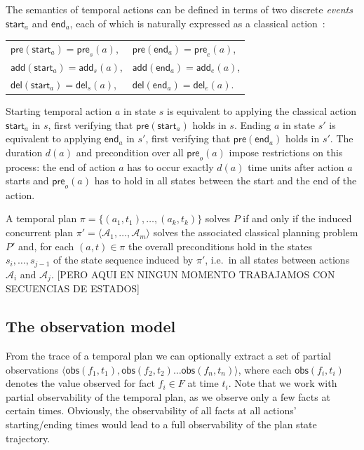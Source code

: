 \documentclass[runningheads]{llncs}
\newcommand{\tup}[1]{{\langle #1 \rangle}}
\newcommand{\pre}{\mathsf{pre}}    %
\newcommand{\obs}{\mathsf{obs}}    %
\newcommand{\add}{\mathsf{add}}
\newcommand{\del}{\mathsf{del}}
\begin{document}
The semantics of temporal actions can be defined in terms of two discrete \textit{events} $\mathsf{start}_a$ and $\mathsf{end}_a$, each of which is naturally expressed as a classical action~\cite{jimenez2015temporal}:

\vspace*{5pt}
\begin{tabular}{ll}
$\pre(\mathsf{start}_a) = \pre_s(a)$, & $\pre(\mathsf{end}_a) = \pre_e(a)$,\\[2pt]
$\add(\mathsf{start}_a) = \add_s(a)$, & $\add(\mathsf{end}_a) = \add_e(a)$,\\[2pt]
$\del(\mathsf{start}_a) = \del_s(a)$, & $\del(\mathsf{end}_a) = \del_e(a)$.
\end{tabular}
\vspace*{5pt}

Starting temporal action $a$ in state $s$ is equivalent to applying the classical action $\mathsf{start}_a$ in $s$, first verifying that $\mathsf{pre}(\mathsf{start}_a)$ holds in $s$. Ending $a$ in state $s'$ is equivalent to applying $\mathsf{end}_a$ in $s'$, first verifying that $\pre(\mathsf{end}_a)$ holds in $s'$. The duration $d(a)$ and precondition over all $\pre_o(a)$ impose restrictions on this process: the end of action $a$ has to occur exactly $d(a)$ time units after action $a$ starts and $\pre_o(a)$ has to hold in all states between the start and the end of the action.

A temporal plan $\pi=\{(a_1,t_1),\ldots,(a_k,t_k)\}$ solves $P$ if and only if the induced concurrent plan $\pi'=\langle\mathcal{A}_1,\ldots,\mathcal{A}_m\rangle$ solves the associated classical planning problem $P'$ and, for each $(a,t)\in\pi$ the overall preconditions hold in the states $s_i,\ldots,s_{j-1}$ of the state sequence induced by $\pi'$, i.e.~in all states between actions $\mathcal{A}_i$ and $\mathcal{A}_j$. [PERO AQUI EN NINGUN MOMENTO TRABAJAMOS CON SECUENCIAS DE ESTADOS]



\subsection{The observation model}
\label{sec:omodel}

From the trace of a temporal plan we can optionally extract a set of partial observations $\tup{\obs(f_1,t_1),\obs(f_2,t_2)\ldots \obs(f_n,t_n)}$, where each $\obs(f_i,t_i)$ denotes the value observed for fact $f_i \in F$ at time $t_i$. Note that we work with partial observability of the temporal plan, as we observe only a few facts at certain times. Obviously, the observability of all facts at all actions' starting/ending times would lead to a full observability of the plan state trajectory.
\end{document}
